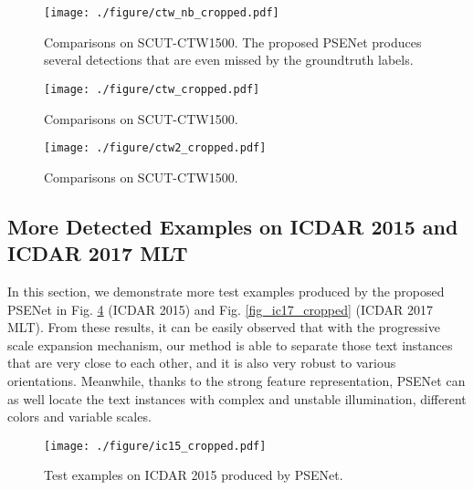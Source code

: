 \documentclass{article}
\begin{document}
\begin{figure}[h]
\begin{center}
		{\texttt{[image: ./figure/ctw\_nb\_cropped.pdf]}}
		\vspace{-10pt}
		\caption{Comparisons on SCUT-CTW1500. The proposed PSENet produces several detections that are even missed by the groundtruth labels. }
		\label{fig_ctw_nb_cropped}
	\end{center}
\end{figure}

\begin{figure}[t]
\begin{center}
		{\texttt{[image: ./figure/ctw\_cropped.pdf]}}
		\vspace{-10pt}
		\caption{Comparisons on SCUT-CTW1500.}
		\label{fig_ctw_cropped}
	\end{center}
\end{figure}

\begin{figure}[t]
\begin{center}
		{\texttt{[image: ./figure/ctw2\_cropped.pdf]}}
		\vspace{-10pt}
		\caption{Comparisons on SCUT-CTW1500.}
		\label{fig_ctw2_cropped}
	\end{center}
\end{figure}

\subsection{More Detected Examples on ICDAR 2015 and ICDAR 2017 MLT}
In this section, we demonstrate more test examples produced by the proposed PSENet in Fig. \ref{fig_ic15_cropped} (ICDAR 2015) and Fig. \ref{fig_ic17_cropped} (ICDAR 2017 MLT). From these results, it can be easily observed that with the progressive scale expansion mechanism, our method is able to separate those text instances that are very close to each other, and it is also very robust to various orientations. Meanwhile, thanks to the strong feature representation, PSENet can as well locate the text instances with complex and unstable illumination, different colors and variable scales. 



\begin{figure}[t]
\begin{center}
		{\texttt{[image: ./figure/ic15\_cropped.pdf]}}
		\vspace{-10pt}
		\caption{Test examples on ICDAR 2015 produced by PSENet.}
		\label{fig_ic15_cropped}
	\end{center}
\end{figure}
\end{document}
